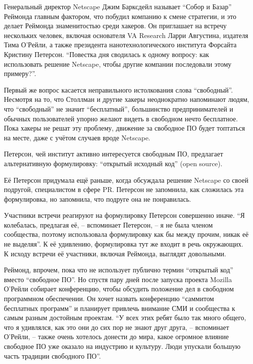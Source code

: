 Генеральный директор Netscape Джим Барксдейл называет \enquote{Собор и Базар} Реймонда главным фактором, что побудил компанию к смене стратегии, и это делает Реймонда знаменитостью среди хакеров. Он приглашает на встречу нескольких человек, включая основателя VA Research Ларри Августина, издателя Тима О'Рейли, а также президента нанотехнологического института Форсайта Кристину Петерсон. \enquote{Повестка дня сводилась к одному вопросу: как использовать решение Netscape, чтобы другие компании последовали этому примеру?}.

Первый же вопрос касается неправильного истолкования слова \enquote{свободный}. Несмотря на то, что Столлман и другие хакеры неоднократно напоминают людям, что \enquote{свободный} не значит \enquote{бесплатный}, большинство предпринимателей и обычных пользователей упорно желают видеть в свободном нечто бесплатное. Пока хакеры не решат эту проблему, движение за свободное ПО будет топтаться на месте, даже с учётом случаев вроде Netscape.

Петерсон, чей институт активно интересуется свободным ПО, предлагает альтернативную формулировку: \enquote{открытый исходный код} (open source).

Её Петерсон придумала ещё раньше, когда обсуждала решение Netscape со своей подругой, специалистом в сфере PR. Петерсон не запомнила, как сложилась эта формулировка, но запомнила, что подруге она не понравилась. 

Участники встречи реагируют на формулировку Петерсон совершенно иначе. \enquote{Я колебалась, предлагая её, -- вспоминает Петерсон, -- я не была членом сообщества, поэтому использовала формулировку как бы между прочим, никак её не выделяя}. К её удивлению, формулировка тут же входит в речь окружающих. К исходу встречи её участники, включая Реймонда, выглядят довольными.

Реймонд, впрочем, пока что не использует публично термин \enquote{открытый код} вместо \enquote{свободное ПО}. Но спустя пару дней после запуска проекта Mozilla О'Рейли собирает конференцию, чтобы обсудить положение дел в свободном программном обеспечении. Он хочет назвать конференцию \enquote{саммитом бесплатных программ} и планирует привлечь внимание СМИ и сообщества к самым разным достойным проектам. \enquote{У всех этих ребят было так много общего, что я удивлялся, как это они до сих пор не знают друг друга, -- вспоминает О'Рейли, -- также очень хотелось донести до мира, какое огромное влияние свободное ПО уже оказало на индустрию и культуру. Люди упускали большую часть традиции свободного ПО}.

